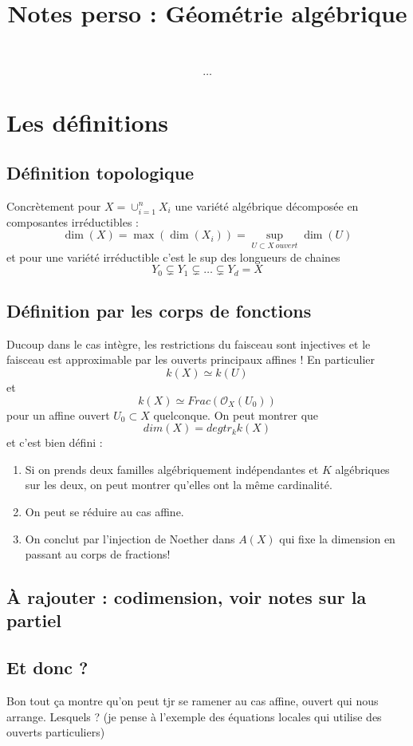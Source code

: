 \documentclass[a4paper,12pt]{book}
\title{Notes perso : Géométrie algébrique}
\date{}
\newcommand{\Or}{\mathcal{O}}
\theoremstyle{plain}
\theoremstyle{definition}
\theoremstyle{remark}
\begin{document}
\maketitle
\tableofcontents
\[\ldots\]   

\chapter{Les définitions}
\section{Définition topologique}
Concrètement pour $X=\cup_{i=1}^n X_i$ une variété algébrique décomposée
en composantes irréductibles :
\[\dim(X)=\max(\dim(X_i))=\sup_{U\subset X~ouvert} \dim(U)\]
et pour une variété irréductible c'est le sup des longueurs de chaines
\[Y_0\subsetneq Y_1\subsetneq \ldots \subsetneq Y_d=X\]

\section{Définition par les corps de fonctions}
Ducoup dans le cas intègre, les restrictions du faisceau sont 
injectives et le faisceau est approximable par les ouverts principaux
affines ! En particulier 
\[k(X)\simeq k(U)\]
et \[k(X)\simeq Frac(\Or_X(U_0))\]
pour un affine ouvert $U_0\subset X$ quelconque. On peut montrer que
\[dim(X)= degtr_k k(X)\]
et c'est bien défini :
\begin{enumerate}
    \item Si on prends deux familles algébriquement 
indépendantes et $K$ algébriques sur les deux, on peut montrer qu'elles
ont la même cardinalité. 
    \item On peut se réduire au cas affine.
    \item On conclut par l'injection de Noether dans $A(X)$ qui fixe la
	dimension en passant au corps de fractions!
\end{enumerate}

\section{À rajouter : codimension, voir notes sur la partiel}

\section{Et donc ?}
Bon tout ça montre qu'on peut tjr se ramener au cas affine, ouvert
qui nous arrange. Lesquels ? (je pense à l'exemple des équations
locales qui utilise des ouverts particuliers)
\end{document}
